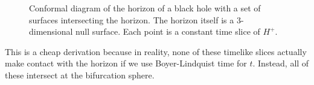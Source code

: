 \documentclass[11pt,table]{article}
\begin{document}
\begin{figure}[h]

\caption{Conformal diagram of the horizon of a black hole with a set of surfaces intersecting the horizon. The horizon itself is a 3-dimensional null surface. Each point is a constant time slice of $H^+$.}
\end{figure}
This is a cheap derivation because in reality, none of these timelike slices actually make contact with the horizon if we use Boyer-Lindquist time for $t$. Instead, all of these intersect at the bifurcation sphere.

\begin{figure}[h]
\centering




\begin{tikzpicture}[x=0.75pt,y=0.75pt,yscale=-1,xscale=1]


\end{tikzpicture}
\end{figure}
\end{document}
